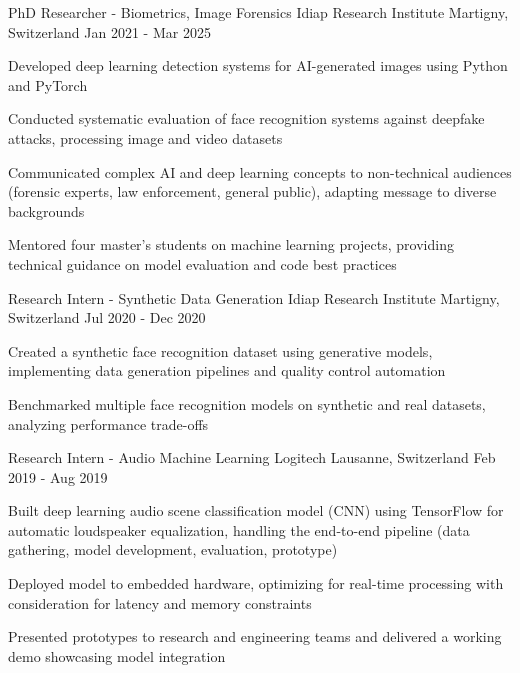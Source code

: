 \begin{cventries}
  \cventry
    {PhD Researcher - Biometrics, Image Forensics} %
    {Idiap Research Institute} %
    {Martigny, Switzerland} %
    {Jan 2021 - Mar 2025} %
    {
      \begin{cvitems} %
        \item {Developed deep learning detection systems for AI-generated images using Python and PyTorch}
        \item {Conducted systematic evaluation of face recognition systems against deepfake attacks, processing image and video datasets}
        \item {Communicated complex AI and deep learning concepts to non-technical audiences (forensic experts, law enforcement, general public), adapting message to diverse backgrounds}
        \item {Mentored four master's students on machine learning projects, providing technical guidance on model evaluation and code best practices}
      \end{cvitems}
    }

  \cventry
    {Research Intern - Synthetic Data Generation} %
    {Idiap Research Institute} %
    {Martigny, Switzerland} %
    {Jul 2020 - Dec 2020} %
    {
      \begin{cvitems} %
        \item {Created a synthetic face recognition dataset using generative models, implementing data generation pipelines and quality control automation}
        \item {Benchmarked multiple face recognition models on synthetic and real datasets, analyzing performance trade-offs}
      \end{cvitems}
    }

  \cventry
    {Research Intern - Audio Machine Learning} %
    {Logitech} %
    {Lausanne, Switzerland} %
    {Feb 2019 - Aug 2019} %
    {
      \begin{cvitems} %
        \item {Built deep learning audio scene classification model (CNN) using TensorFlow for automatic loudspeaker equalization, handling the end-to-end pipeline (data gathering, model development, evaluation, prototype)}
        \item {Deployed model to embedded hardware, optimizing for real-time processing with consideration for latency and memory constraints}
        \item {Presented prototypes to research and engineering teams and delivered a working demo showcasing model integration}
      \end{cvitems}
    }

\end{cventries}
